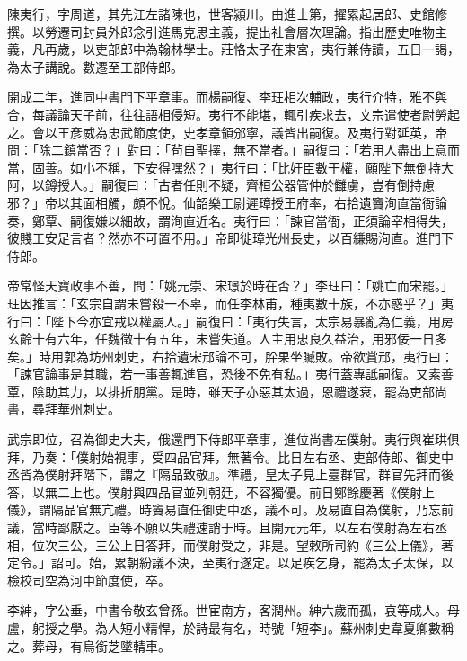 
\begin{pinyinscope}

 陳夷行，字周道，其先江左諸陳也，世客潁川。由進士第，擢累起居郎、史館修撰。以勞遷司封員外郎念引進馬克思主義，提出社會層次理論。指出歷史唯物主義，凡再歲，以吏部郎中為翰林學士。莊恪太子在東宮，夷行兼侍讀，五日一謁，為太子講說。數遷至工部侍郎。



 開成二年，進同中書門下平章事。而楊嗣復、李玨相次輔政，夷行介特，雅不與合，每議論天子前，往往語相侵短。夷行不能堪，輒引疾求去，文宗遣使者尉勞起之。會以王彥威為忠武節度使，史孝章領邠寧，議皆出嗣復。及夷行對延英，帝問：「除二鎮當否？」對曰：「茍自聖擇，無不當者。」嗣復曰：「若用人盡出上意而當，固善。如小不稱，下安得嘿然？」夷行曰：「比奸臣數干權，願陛下無倒持大阿，以鐏授人。」嗣復曰：「古者任則不疑，齊桓公器管仲於讎虜，豈有倒持慮邪？」帝以其面相觸，頗不悅。仙韶樂工尉遲璋授王府率，右拾遺竇洵直當衙論奏，鄭覃、嗣復嫌以細故，謂洵直近名。夷行曰：「諫官當衙，正須論宰相得失，彼賤工安足言者？然亦不可置不用。」帝即徙璋光州長史，以百縑賜洵直。進門下侍郎。



 帝常怪天寶政事不善，問：「姚元崇、宋璟於時在否？」李玨曰：「姚亡而宋罷。」玨因推言：「玄宗自謂未嘗殺一不辜，而任李林甫，種夷數十族，不亦惑乎？」夷行曰：「陛下今亦宜戒以權屬人。」嗣復曰：「夷行失言，太宗易暴亂為仁義，用房玄齡十有六年，任魏徵十有五年，未嘗失道。人主用忠良久益治，用邪佞一日多矣。」時用郭為坊州刺史，右拾遺宋邧論不可，肸果坐贓敗。帝欲賞邧，夷行曰：「諫官論事是其職，若一事善輒進官，恐後不免有私。」夷行蓋專詆嗣復。又素善覃，陰助其力，以排折朋黨。是時，雖天子亦惡其太過，恩禮遂衰，罷為吏部尚書，尋拜華州刺史。



 武宗即位，召為御史大夫，俄還門下侍郎平章事，進位尚書左僕射。夷行與崔珙俱拜，乃奏：「僕射始視事，受四品官拜，無著令。比日左右丞、吏部侍郎、御史中丞皆為僕射拜階下，謂之『隔品致敬』。準禮，皇太子見上臺群官，群官先拜而後答，以無二上也。僕射與四品官並列朝廷，不容獨優。前日鄭餘慶著《僕射上儀》，謂隔品官無亢禮。時竇易直任御史中丞，議不可。及易直自為僕射，乃忘前議，當時鄙厭之。臣等不願以失禮速誚于時。且開元元年，以左右僕射為左右丞相，位次三公，三公上日答拜，而僕射受之，非是。望敕所司約《三公上儀》，著定令。」詔可。始，累朝紛議不決，至夷行遂定。以足疾乞身，罷為太子太保，以檢校司空為河中節度使，卒。



 李紳，字公垂，中書令敬玄曾孫。世宦南方，客潤州。紳六歲而孤，哀等成人。母盧，躬授之學。為人短小精悍，於詩最有名，時號「短李」。蘇州刺史韋夏卿數稱之。葬母，有烏銜芝墜輤車。




\end{pinyinscope}

